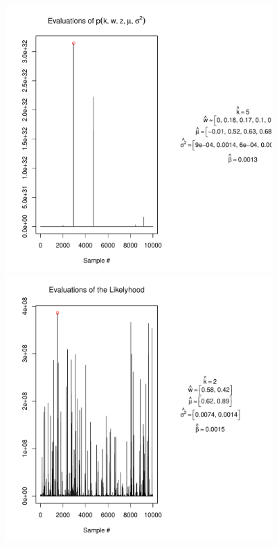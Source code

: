 \documentclass{article}
\begin{document}
\begin{figure}
	\begin{minipage}[h!]{0.49\textwidth}
		\centering
		\includegraphics[width=1\textwidth, height=4in]{postTrace.pdf}
	\end{minipage}
	\begin{minipage}[h!]{0.49\textwidth}
		\centering
		\includegraphics[width=1\textwidth, height=4in]{likelyhoodTrace.pdf}	
	\end{minipage}
\end{figure}

\clearpage
\end{document}

